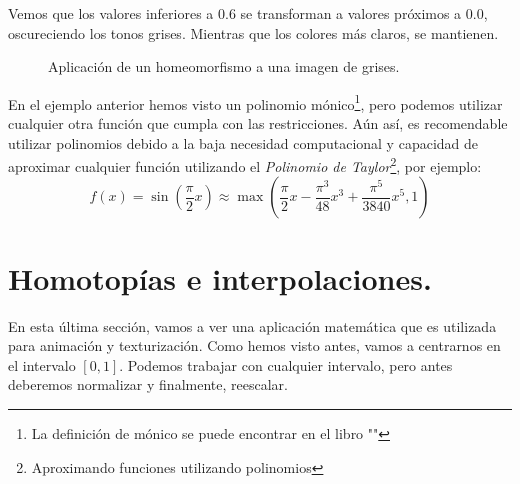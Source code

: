 Vemos que los valores inferiores a \(0.6\) se transforman a valores próximos a \(0.0\), oscureciendo los tonos grises. Mientras que los colores más claros, se mantienen.
\begin{figure}[H]
  \centering
  \captionsetup{justification=centering}%
  \hfill
  \caption{Aplicación de un homeomorfismo a una imagen de grises.}
\end{figure}

En el ejemplo anterior hemos visto un polinomio mónico\footnote{La definición de mónico se puede encontrar en el libro ""}, pero podemos utilizar cualquier otra función que cumpla con las restricciones. Aún así, es recomendable utilizar polinomios debido a la baja necesidad computacional y capacidad de aproximar cualquier función utilizando el \textit{Polinomio de Taylor}\footnote{Aproximando funciones utilizando polinomios}, por ejemplo:
\[ f(x)=\sin\left(\dfrac{\pi}{2}x\right)\approx \max\left(\dfrac{\pi}{2}x-\dfrac{\pi^3}{48}x^3+\dfrac{\pi^5}{3840}x^5, 1\right) \]

\section{Homotopías e interpolaciones.}
En esta última sección, vamos a ver una aplicación matemática que es utilizada para animación y texturización.
Como hemos visto antes, vamos a centrarnos en el intervalo \([0, 1]\). Podemos trabajar con cualquier intervalo, pero antes deberemos normalizar y finalmente, reescalar.

